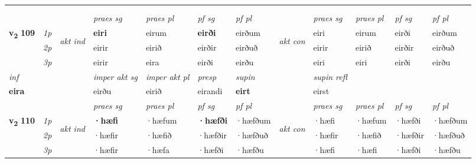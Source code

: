 \begin{longtable}[l]{X>{\footnotesize\itshape}llXXXXlXXXX}
\midrule

  & \\*
  & \\
    \midrule
 & &   & \textit{praes sg}  & \textit{praes pl}    & \textit{ pf sg} & \textit{pf pl} & & \textit{praes sg}  & \textit{praes pl}    & \textit{pf sg} & \textit{pf pl }  \\ \cmidrule{4-7} \cmidrule{9-12}
 \multirow{2}{*}{{{\textbf{v{\textsubscript{2}}} \Large{\textbf{109}}}}}  & 1p & \multirow{3}{*}{\begin{turn}{90}\textit{akt ind}\end{turn}} & \textbf{eiri} & eirum & \textbf{eirði} & eirðum & \multirow{3}{*}{\begin{turn}{90}\textit{akt con}\end{turn}} &eiri & eirum & eirði & eirðum\\*
 & 2p &  &  eirir  & eirið & eirðir & eirðuð & & eirir & eirið & eirðir & eirðuð \\*
 & 3p &  & eirir & eira & eirði & eirðu & & eiri & eiri& eirði & eirðu \\*
\cmidrule{4-7} \cmidrule{9-12}

   {\textit{inf}} & &  & \textit{imper akt sg} & \textit{imper akt pl}   & \textit{presp} & \textit{supin} && \textit{supin refl}  \\*
  {\textbf{eira}} & && eirðu  & eirið   & eirandi &  \textbf{eirt} && eirst  \\*

\midrule

 & &   & \textit{praes sg}  & \textit{praes pl}    & \textit{ pf sg} & \textit{pf pl} & & \textit{praes sg}  & \textit{praes pl}    & \textit{pf sg} & \textit{pf pl }  \\ \cmidrule{4-7} \cmidrule{9-12}
 \multirow{2}{*}{{{\textbf{v{\textsubscript{2}}} \Large{\textbf{110}}}}}  & 1p & \multirow{3}{*}{\begin{turn}{90}\textit{akt ind}\end{turn}} & \textbf{·hæfi} & ·hæfum & \textbf{·hæfði} & ·hæfðum & \multirow{3}{*}{\begin{turn}{90}\textit{akt con}\end{turn}} &·hæfi & ·hæfum & ·hæfði & ·hæfðum\\*
 & 2p &  &  ·hæfir  & ·hæfið & ·hæfðir & ·hæfðuð & & ·hæfir & ·hæfið & ·hæfðir & ·hæfðuð \\*
 & 3p &  & ·hæfir & ·hæfa & ·hæfði & ·hæfðu & & ·hæfi & ·hæfi& ·hæfði & ·hæfðu \\*
\cmidrule{4-7} \cmidrule{9-12}


\end{longtable}
